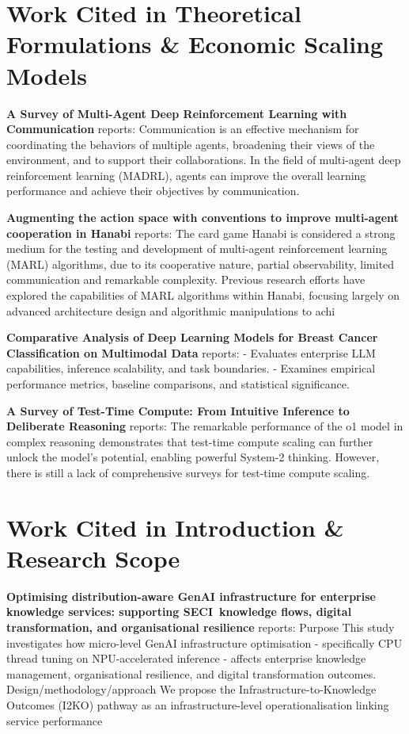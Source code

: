 \documentclass{article}
\begin{document}
\section{Work Cited in Theoretical Formulations \& Economic Scaling Models}


\textbf{A Survey of Multi-Agent Deep Reinforcement Learning with Communication} \cite{arxiv_2203_08975} reports: Communication is an effective mechanism for coordinating the behaviors of multiple agents, broadening their views of the environment, and to support their collaborations. In the field of multi-agent deep reinforcement learning (MADRL), agents can improve the overall learning performance and achieve their objectives by communication.

\textbf{Augmenting the action space with conventions to improve multi-agent cooperation in Hanabi} \cite{arxiv_2412_06333} reports: The card game Hanabi is considered a strong medium for the testing and development of multi-agent reinforcement learning (MARL) algorithms, due to its cooperative nature, partial observability, limited communication and remarkable complexity. Previous research efforts have explored the capabilities of MARL algorithms within Hanabi, focusing largely on advanced architecture design and algorithmic manipulations to achi

\textbf{Comparative Analysis of Deep Learning Models for Breast Cancer Classification on Multimodal Data} \cite{crossref_10_1145_3689096_3689462} reports: - Evaluates enterprise LLM capabilities, inference scalability, and task boundaries. - Examines empirical performance metrics, baseline comparisons, and statistical significance.

\textbf{A Survey of Test-Time Compute: From Intuitive Inference to Deliberate Reasoning} \cite{arxiv_2501_02497} reports: The remarkable performance of the o1 model in complex reasoning demonstrates that test-time compute scaling can further unlock the model's potential, enabling powerful System-2 thinking. However, there is still a lack of comprehensive surveys for test-time compute scaling.


\section{Work Cited in Introduction \& Research Scope}


\textbf{Optimising distribution-aware GenAI infrastructure for enterprise knowledge services: supporting SECI knowledge flows, digital transformation, and organisational resilience} \cite{crossref_10_1108_jeim_12_2025_1269} reports: Purpose This study investigates how micro-level GenAI infrastructure optimisation - specifically CPU thread tuning on NPU-accelerated inference - affects enterprise knowledge management, organisational resilience, and digital transformation outcomes. Design/methodology/approach We propose the Infrastructure-to-Knowledge Outcomes (I2KO) pathway as an infrastructure-level operationalisation linking service performance 
\end{document}
